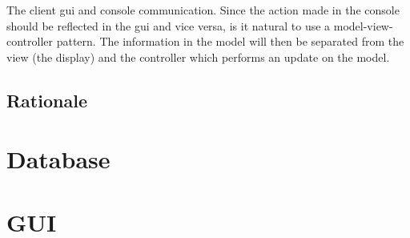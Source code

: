 The client gui and console communication. Since the action made in the console should be reflected in the gui and vice versa, is it natural to use a model-view-controller pattern. The information in the model will then be separated from the view (the display) and the controller which performs an update on the model. 


\subsection{Rationale}


\section{Database}
\section{GUI}

